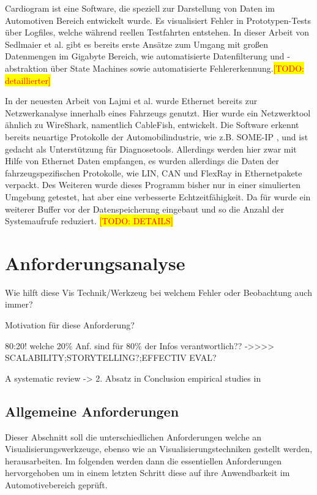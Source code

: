\documentclass[draft=false
              ,paper=a4
              ,twoside=false
              ,fontsize=11pt
              ,headsepline
              ,BCOR10mm
              ,DIV11
              ]{scrbook}
\newcommand{\TODO}[1]{\colorbox{yellow}{\textcolor{red}{[TODO: #1]}}}
\begin{document}
Cardiogram \cite{sedlmair_cardiogram:_2011} ist eine Software, die speziell zur Darstellung von Daten im Automotiven Bereich entwickelt wurde. Es visualisiert Fehler in Prototypen-Tests über Logfiles, welche während reellen Testfahrten entstehen. In dieser Arbeit von Sedlmaier et al. gibt es bereits erste Ansätze zum Umgang mit großen Datenmengen im Gigabyte Bereich, wie automatisierte Datenfilterung und -abstraktion über State Machines sowie automatisierte Fehlererkennung.\TODO{detaillierter}


In der neuesten Arbeit von Lajmi et al. \cite{lajmi_using_2013} wurde Ethernet bereits zur Netzwerkanalyse innerhalb eines Fahrzeugs genutzt. Hier wurde ein Netzwerktool ähnlich zu WireShark, namentlich CableFish, entwickelt. Die Software erkennt bereits neuartige Protokolle der Automobilindustrie, wie z.B. SOME-IP \cite{someip_scalable_2014}, und ist gedacht als Unterstützung für Diagnosetools. Allerdings werden hier zwar mit Hilfe von Ethernet Daten empfangen, es wurden allerdings die Daten der fahrzeugspezifischen Protokolle, wie LIN, CAN und FlexRay in Ethernetpakete verpackt. Des Weiteren wurde dieses Programm bisher nur in einer simulierten Umgebung getestet, hat aber eine verbesserte Echtzeitfähigkeit. Da für wurde ein weiterer Buffer vor der Datenspeicherung eingebaut und so die Anzahl der Systemaufrufe reduziert. \TODO{DETAILS}

\chapter{Anforderungsanalyse} %
\label{cha:anforderungsanalyse}
Wie hilft diese Vis Technik/Werkzeug bei welchem Fehler oder Beobachtung auch immer?

Motivation für diese Anforderung?

80:20! welche 20\% Anf. sind für 80\% der Infos verantwortlich??\newline
->>>> SCALABILITY;STORYTELLING?;EFFECTIV EVAL?

A systematic review -> 2. Absatz in Conclusion \cite{isenberg_systematic_2013} \newline
empirical studies in \cite{lam_empirical_2012}

\section{Allgemeine Anforderungen} %
\label{sec:allgemeine_anforderungen}
Dieser Abschnitt soll die unterschiedlichen Anforderungen welche an Visualisierungswerkzeuge, ebenso wie an Visualisierungstechniken gestellt werden, herausarbeiten. Im folgenden werden dann die essentiellen Anforderungen hervorgehoben um in einem letzten Schritt diese auf ihre Anwendbarkeit im Automotivebereich geprüft.
\end{document}
